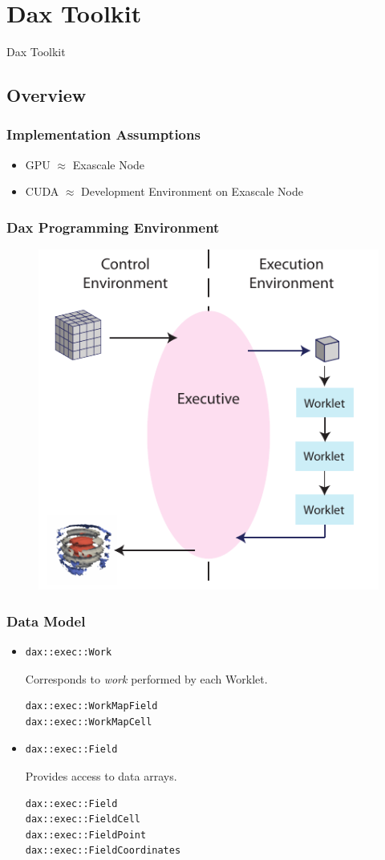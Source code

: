 \documentclass[brown]{beamer}
\newcommand\mysection[1]{
  \section{#1}
  \begin{frame}
    \begin{center}{\LARGE
      #1
      }
    \end{center}
  \end{frame}
}
\begin{document}
\mysection{Dax Toolkit}
\subsection{Overview}

\frame
{
  \frametitle{Implementation Assumptions}
  \begin{itemize}
  \item GPU $\approx$ Exascale Node
  \item CUDA $\approx$ Development Environment on Exascale Node
  \end{itemize}
}

\frame
{
  \frametitle{Dax Programming Environment}
  \begin{figure}[htbp]
    \centering
    \includegraphics[width=.6\textwidth]{images/DaxDiagram}
  \end{figure}
}

\begin{frame}[fragile]
\frametitle{Data Model}

\begin{itemize}
\item %
\begin{lstlisting}[language=Dax]
dax::exec::Work
\end{lstlisting} %

Corresponds to \emph{work} performed by each Worklet. %
\begin{lstlisting}[language=Dax]
dax::exec::WorkMapField
dax::exec::WorkMapCell
\end{lstlisting}

\item %
\begin{lstlisting}[language=Dax]
dax::exec::Field
\end{lstlisting}%

Provides access to data arrays. %
\begin{lstlisting}[language=Dax]
dax::exec::Field
dax::exec::FieldCell
dax::exec::FieldPoint
dax::exec::FieldCoordinates
\end{lstlisting}
\end{itemize}
\end{frame}
\end{document}
